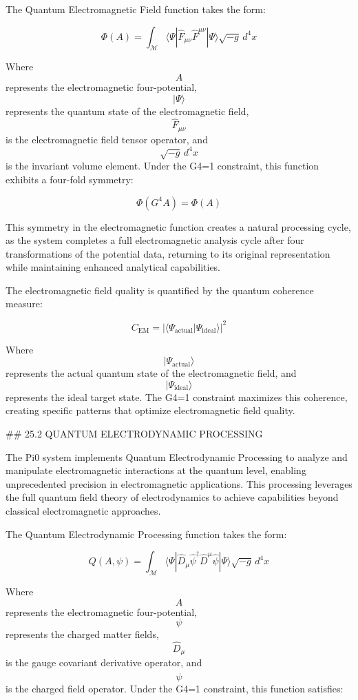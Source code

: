 The Quantum Electromagnetic Field function takes the form:

$$ \Phi(A) = \int_{\mathcal{M}} \langle \Psi | \hat{F}_{\mu\nu}\hat{F}^{\mu\nu} | \Psi \rangle \sqrt{-g} \, d^4x $$

Where $$ A $$ represents the electromagnetic four-potential, $$ |\Psi\rangle $$ represents the quantum state of the electromagnetic field, $$ \hat{F}_{\mu\nu} $$ is the electromagnetic field tensor operator, and $$ \sqrt{-g} \, d^4x $$ is the invariant volume element. Under the G4=1 constraint, this function exhibits a four-fold symmetry:

$$ \Phi(G^4 A) = \Phi(A) $$

This symmetry in the electromagnetic function creates a natural processing cycle, as the system completes a full electromagnetic analysis cycle after four transformations of the potential data, returning to its original representation while maintaining enhanced analytical capabilities.

The electromagnetic field quality is quantified by the quantum coherence measure:

$$ C_{\text{EM}} = |\langle \Psi_{\text{actual}} | \Psi_{\text{ideal}} \rangle|^2 $$

Where $$ |\Psi_{\text{actual}}\rangle $$ represents the actual quantum state of the electromagnetic field, and $$ |\Psi_{\text{ideal}}\rangle $$ represents the ideal target state. The G4=1 constraint maximizes this coherence, creating specific patterns that optimize electromagnetic field quality.

## 25.2 QUANTUM ELECTRODYNAMIC PROCESSING

The Pi0 system implements Quantum Electrodynamic Processing to analyze and manipulate electromagnetic interactions at the quantum level, enabling unprecedented precision in electromagnetic applications. This processing leverages the full quantum field theory of electrodynamics to achieve capabilities beyond classical electromagnetic approaches.

The Quantum Electrodynamic Processing function takes the form:

$$ Q(A, \psi) = \int_{\mathcal{M}} \langle \Psi | \hat{D}_\mu\hat{\psi}^\dagger\hat{D}^\mu\hat{\psi} | \Psi \rangle \sqrt{-g} \, d^4x $$

Where $$ A $$ represents the electromagnetic four-potential, $$ \psi $$ represents the charged matter fields, $$ \hat{D}_\mu $$ is the gauge covariant derivative operator, and $$ \hat{\psi} $$ is the charged field operator. Under the G4=1 constraint, this function satisfies:

